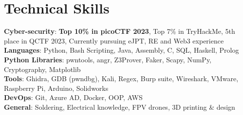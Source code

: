 \section{Technical Skills}

\begin{itemize}[leftmargin=0.15in, label={}]
    \small{\item{
        \textbf{Cyber-security}{: \textbf{Top 10\% in picoCTF 2023}, Top 7\% in TryHackMe, 5th place in QCTF 2023, Currently pursuing eJPT, RE and Web3 experience} \\ \vspace{1.5mm}
        \textbf{Languages}{: Python, Bash Scripting, Java, Assembly, C, SQL, Haskell, Prolog} \\ \vspace{1.5mm}
        \textbf{Python Libraries}{: pwntools, angr, Z3Prover, Faker, Scapy, NumPy, Cryptography, Matplotlib} \\ \vspace{1.5mm}
        \textbf{Tools}{: Ghidra, GDB (pwndbg), Kali, Regex, Burp suite, Wireshark, VMware, Raspberry Pi, Arduino, Solidworks} \\ \vspace{1.5mm}
        \textbf{DevOps}{: Git, Azure AD, Docker, OOP, AWS}\\ \vspace{1.5mm}
        \textbf{General}{: Soldering, Electrical knowledge, FPV drones, 3D printing \& design}\\
    }}
\end{itemize}